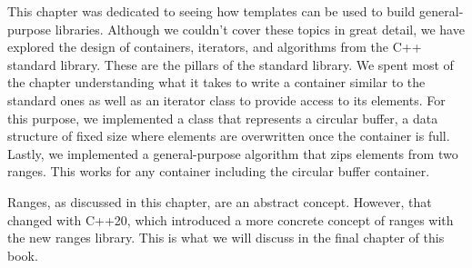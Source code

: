 This chapter was dedicated to seeing how templates can be used to build general-purpose libraries. Although we couldn’t cover these topics in great detail, we have explored the design of containers, iterators, and algorithms from the C++ standard library. These are the pillars of the standard library. We spent most of the chapter understanding what it takes to write a container similar to the standard ones as well as an iterator class to provide access to its elements. For this purpose, we implemented a class that represents a circular buffer, a data structure of fixed size where elements are overwritten once the container is full. Lastly, we implemented a general-purpose algorithm that zips elements from two ranges. This works for any container including the circular buffer container.

Ranges, as discussed in this chapter, are an abstract concept. However, that changed with C++20, which introduced a more concrete concept of ranges with the new ranges library.
This is what we will discuss in the final chapter of this book.
